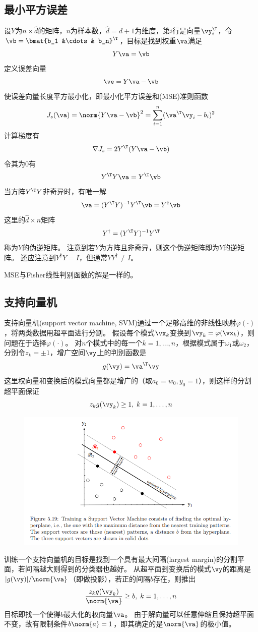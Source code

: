 \subsection{最小平方误差}
设$Y$为$n\times\hat{d}$的矩阵，$n$为样本数，$\hat{d}=d+1$为维度，第$i$行是向量$\vy_i^\T$，令$\vb=\bmat{b_1 &\cdots & b_n}^\T$，目标是找到权重$\va$满足
\[Y\va=\vb\]
定义误差向量
\[\ve=Y\va-\vb\]
使误差向量长度平方最小化，即最小化平方误差和(MSE)准则函数
\[J_s(\va)=\norm{Y\va-\vb}^2=\sum_{i=1}^n(\va^\T\vy_i-b_i)^2\]
计算梯度有
\[\nabla J_s=2Y^\T(Y\va-\vb)\]
令其为$0$有
\[Y^\T Y\va=Y^\T\vb\]
当方阵$Y^\T Y$非奇异时，有唯一解
\[\va=(Y^\T Y)^{-1} Y^\T\vb=Y^\dag\vb\]
这里的$\hat{d}\times n$矩阵
\[Y^\dag=(Y^\T Y)^{-1} Y^\T\]
称为$Y$的伪逆矩阵。
注意到若$Y$为方阵且非奇异，则这个伪逆矩阵即为$Y$的逆矩阵。
还应注意到$Y^\dag Y=I$，但通常$YY^\dag\ne I$。

MSE与Fisher线性判别函数的解是一样的。

\subsection{支持向量机}
支持向量机(support vector machine, SVM)通过一个足够高维的非线性映射$\varphi(\cdot)$，将两类数据用超平面进行分割。
假设每个模式$\vx_k$变换到$\vy_k=\varphi(\vx_k)$，则问题在于选择$\varphi(\cdot)$。
对$n$个模式中的每一个$k=1,\ldots,n$，根据模式属于$\omega_1$或$\omega_2$，分别令$z_k=\pm 1$，增广空间$\vy$上的判别函数是
\[g(\vy)=\va^\T\vy\]
这里权向量和变换后的模式向量都是增广的（取$a_0=w_0,y_0=1$），则这样的分割超平面保证
\[z_kg(\vy_k)\geq 1,\;k=1,\ldots,n\]
\begin{figure}[H]
\centering
\includegraphics[width=0.9\linewidth]{fig/SVM.png}
\end{figure}

训练一个支持向量机的目标是找到一个具有最大间隔(largest margin)的分割平面，若间隔越大则得到的分类器也越好。
从超平面到变换后的模式$\vy$的距离是$|g(\vy)|/\norm{\va}$（即做投影），若正的间隔$b$存在，则推出
\[\frac{z_kg(\vy_k)}{\norm{\va}}\geq b,\;k=1,\ldots,n\]
目标即找一个使得$b$最大化的权向量$\va$。
由于解向量可以任意伸缩且保持超平面不变，故有限制条件$b\norm{a}=1$，即其确定的是$\norm{\va}$的极小值。

